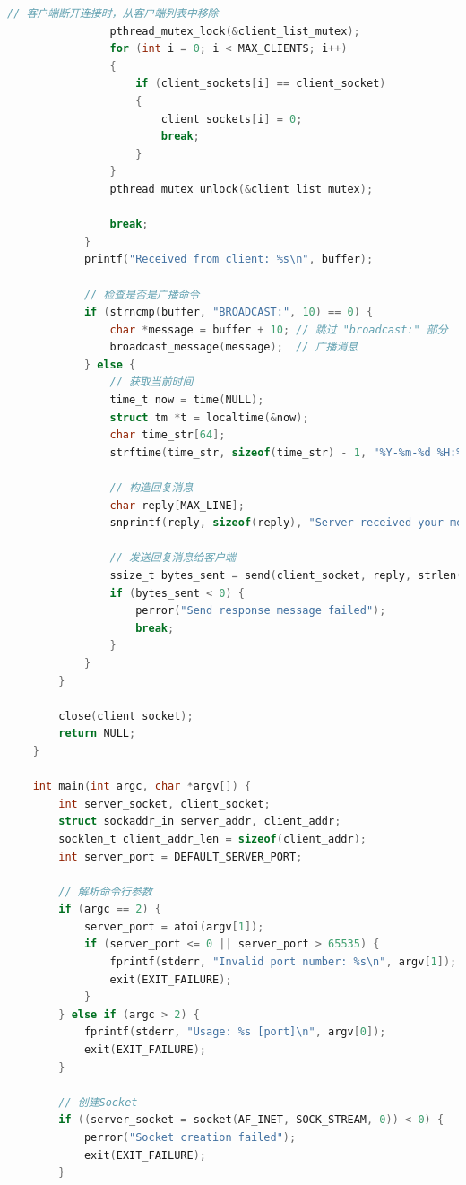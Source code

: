 \documentclass[14pt,a4paper,UTF8,twoside]{article}
\begin{document}
\begin{lstlisting}[language=C]
                // 客户端断开连接时，从客户端列表中移除
                pthread_mutex_lock(&client_list_mutex);
                for (int i = 0; i < MAX_CLIENTS; i++)
                {
                    if (client_sockets[i] == client_socket)
                    {
                        client_sockets[i] = 0;
                        break;
                    }
                }
                pthread_mutex_unlock(&client_list_mutex);
    
                break;
            }
            printf("Received from client: %s\n", buffer);
    
            // 检查是否是广播命令
            if (strncmp(buffer, "BROADCAST:", 10) == 0) {
                char *message = buffer + 10; // 跳过 "broadcast:" 部分
                broadcast_message(message);  // 广播消息
            } else {
                // 获取当前时间
                time_t now = time(NULL);
                struct tm *t = localtime(&now);
                char time_str[64];
                strftime(time_str, sizeof(time_str) - 1, "%Y-%m-%d %H:%M:%S", t);
    
                // 构造回复消息
                char reply[MAX_LINE];
                snprintf(reply, sizeof(reply), "Server received your message at %s\n", time_str);
    
                // 发送回复消息给客户端
                ssize_t bytes_sent = send(client_socket, reply, strlen(reply), 0);
                if (bytes_sent < 0) {
                    perror("Send response message failed");
                    break;
                }
            }
        }
    
        close(client_socket);
        return NULL;
    }
    
    int main(int argc, char *argv[]) {
        int server_socket, client_socket;
        struct sockaddr_in server_addr, client_addr;
        socklen_t client_addr_len = sizeof(client_addr);
        int server_port = DEFAULT_SERVER_PORT;
    
        // 解析命令行参数
        if (argc == 2) {
            server_port = atoi(argv[1]);
            if (server_port <= 0 || server_port > 65535) {
                fprintf(stderr, "Invalid port number: %s\n", argv[1]);
                exit(EXIT_FAILURE);
            }
        } else if (argc > 2) {
            fprintf(stderr, "Usage: %s [port]\n", argv[0]);
            exit(EXIT_FAILURE);
        }
    
        // 创建Socket
        if ((server_socket = socket(AF_INET, SOCK_STREAM, 0)) < 0) {
            perror("Socket creation failed");
            exit(EXIT_FAILURE);
        }
    

\end{lstlisting}
\end{document}
